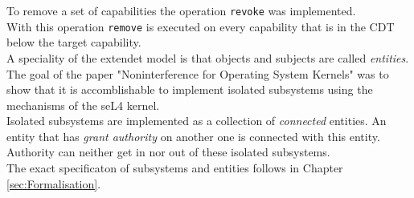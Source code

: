 \documentclass[pdftex,11pt,a4paper,twoside]{article}
\begin{document}
	To remove a set of capabilities the operation \texttt{revoke} was implemented. \\ 
	With this operation \texttt{remove} is executed on every capability that is in the CDT below the target capability. \\
	A speciality of the extendet model is that objects and subjects are called \textit{entities}.\\
	The goal of the paper "Noninterference for Operating System Kernels" was to show that it is accomblishable to implement isolated subsystems using the mechanisms of the seL4 kernel. \cite{TakeG} \\
	Isolated subsystems are implemented as a collection of \textit{connected} entities. An entity that has \textit{grant authority} on another one is connected with this entity. Authority can neither get in nor out of these isolated subsystems.\\
	The exact specificaton of subsystems and entities follows in Chapter \ref{sec:Formalisation}.
	
\end{document}

